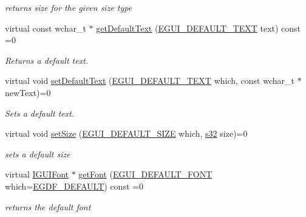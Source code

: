 \begin{DoxyCompactItemize}
\begin{DoxyCompactList}\small\item\em returns size for the given size type \end{DoxyCompactList}\item 
virtual const wchar\+\_\+t $\ast$ \hyperlink{classirr_1_1gui_1_1IGUISkin_a48a987d458a0e6f4e71fe6fd9cfecb2d}{get\+Default\+Text} (\hyperlink{namespaceirr_1_1gui_a18bc64c635f8b0db66498d779569e296}{E\+G\+U\+I\+\_\+\+D\+E\+F\+A\+U\+L\+T\+\_\+\+T\+E\+XT} text) const =0
\begin{DoxyCompactList}\small\item\em Returns a default text. \end{DoxyCompactList}\item 
virtual void \hyperlink{classirr_1_1gui_1_1IGUISkin_a782a67363479b5cf7d085189774908ef}{set\+Default\+Text} (\hyperlink{namespaceirr_1_1gui_a18bc64c635f8b0db66498d779569e296}{E\+G\+U\+I\+\_\+\+D\+E\+F\+A\+U\+L\+T\+\_\+\+T\+E\+XT} which, const wchar\+\_\+t $\ast$new\+Text)=0
\begin{DoxyCompactList}\small\item\em Sets a default text. \end{DoxyCompactList}\item 
\mbox{\label{classirr_1_1gui_1_1IGUISkin_afed39dadcfbdc74138f60a02d7b92d2d}} 
virtual void \hyperlink{classirr_1_1gui_1_1IGUISkin_afed39dadcfbdc74138f60a02d7b92d2d}{set\+Size} (\hyperlink{namespaceirr_1_1gui_a27be6aa12d4985a5005983182fe99d56}{E\+G\+U\+I\+\_\+\+D\+E\+F\+A\+U\+L\+T\+\_\+\+S\+I\+ZE} which, \hyperlink{namespaceirr_ac66849b7a6ed16e30ebede579f9b47c6}{s32} size)=0
\begin{DoxyCompactList}\small\item\em sets a default size \end{DoxyCompactList}\item 
\mbox{\label{classirr_1_1gui_1_1IGUISkin_ab1b2623d04688c4dfe106ca407171d6e}} 
virtual \hyperlink{classirr_1_1gui_1_1IGUIFont}{I\+G\+U\+I\+Font} $\ast$ \hyperlink{classirr_1_1gui_1_1IGUISkin_ab1b2623d04688c4dfe106ca407171d6e}{get\+Font} (\hyperlink{namespaceirr_1_1gui_a9e598ab5e8644d142e55d66e8d308441}{E\+G\+U\+I\+\_\+\+D\+E\+F\+A\+U\+L\+T\+\_\+\+F\+O\+NT} which=\hyperlink{namespaceirr_1_1gui_a9e598ab5e8644d142e55d66e8d308441a48517b1e27e7cf4362c05ed8d5e639bf}{E\+G\+D\+F\+\_\+\+D\+E\+F\+A\+U\+LT}) const =0
\begin{DoxyCompactList}\small\item\em returns the default font \end{DoxyCompactList}\item 

\end{DoxyCompactItemize}
